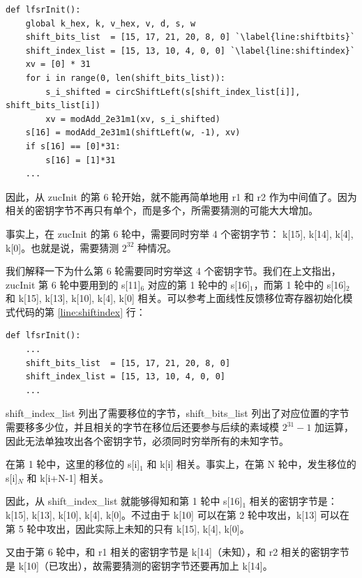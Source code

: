 \begin{lstlisting}[style=myPython]
def lfsrInit():
    global k_hex, k, v_hex, v, d, s, w
    shift_bits_list  = [15, 17, 21, 20, 8, 0] `\label{line:shiftbits}`
    shift_index_list = [15, 13, 10, 4, 0, 0] `\label{line:shiftindex}`
    xv = [0] * 31
    for i in range(0, len(shift_bits_list)):
        s_i_shifted = circShiftLeft(s[shift_index_list[i]], shift_bits_list[i])
        xv = modAdd_2e31m1(xv, s_i_shifted)
    s[16] = modAdd_2e31m1(shiftLeft(w, -1), xv)
    if s[16] == [0]*31:
        s[16] = [1]*31
    ...
\end{lstlisting}

因此，从 {\cnsls zucInit} 的第 6 轮开始，就不能再简单地用 {\cnsls r1} 和 {\cnsls r2} 作为中间值了。因为相关的密钥字节不再只有单个，而是多个，所需要猜测的可能大大增加。

事实上，在 {\cnsls zucInit} 的第 6 轮中，需要同时穷举 4 个密钥字节： {\cnsls k[15], k[14], k[4], k[0]}。也就是说，需要猜测 $2^{32}$ 种情况。

\newpage

我们解释一下为什么第 6 轮需要同时穷举这 4 个密钥字节。我们在上文指出，{\cnsls zucInit} 第 6 轮中要用到的 {\cnsls s[11]$_6$} 对应的第 1 轮中的 {\cnsls s[16]$_1$}，而第 1 轮中的 {\cnsls s[16]$_2$} 和 {\cnsls k[15], k[13], k[10], k[4], k[0]} 相关。可以参考上面线性反馈移位寄存器初始化模式代码的第 \ref{line:shiftindex} 行：

\begin{lstlisting}[style=myPython]
def lfsrInit():
    ...
    shift_bits_list  = [15, 17, 21, 20, 8, 0]
    shift_index_list = [15, 13, 10, 4, 0, 0]
    ...
\end{lstlisting}

{\cnsls shift\_index\_list} 列出了需要移位的字节，{\cnsls shift\_bits\_list} 列出了对应位置的字节需要移多少位，并且相关的字节在移位后还要参与后续的素域模 $2^{31}-1$ 加运算，因此无法单独攻出各个密钥字节，必须同时穷举所有的未知字节。

在第 1 轮中，这里的移位的 {\cnsls s[i]$_1$} 和 {\cnsls k[i]} 相关。事实上，在第 N 轮中，发生移位的 {\cnsls s[i]$_N$} 和 {\cnsls k[i+N-1]} 相关。

因此，从 {\cnsls shift\_index\_list} 就能够得知和第 1 轮中 {\cnsls s[16]$_1$} 相关的密钥字节是：{\cnsls k[15], k[13], k[10], k[4], k[0]}。不过由于 {\cnsls k[10]} 可以在第 2 轮中攻出，{\cnsls k[13]} 可以在第 5 轮中攻出，因此实际上未知的只有 {\cnsls k[15], k[4], k[0]}。

又由于第 6 轮中，和 {\cnsls r1} 相关的密钥字节是 {\cnsls k[14]}（未知），和 {\cnsls r2} 相关的密钥字节是 {\cnsls k[10]}（已攻出），故需要猜测的密钥字节还要再加上 {\cnsls k[14]}。

